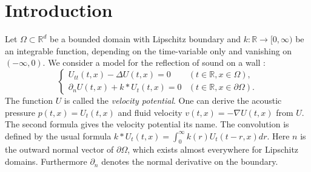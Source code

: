 \documentclass{amsart}
\newcommand{\R}{\mathbb{R}}
\begin{document}
\section{Introduction}\label{sec: Introduction}
Let $\Omega\subset\R^d$ be a bounded domain with Lipschitz boundary and $k:\R\rightarrow[0,\infty)$ be an integrable function, depending on the time-variable only and vanishing on $(-\infty,0)$. We consider a model for the reflection of sound on a wall \cite{PrussProbst1996}: 
\begin{equation}\label{eq: wave equation}
 \begin{cases}
  U_{tt}(t,x) - \Delta U(t,x) = 0 &  (t\in\R, x\in\Omega), \\
  \partial_n U(t,x) + k* U_t(t,x) = 0 & (t\in\R, x\in\partial\Omega).
 \end{cases}
\end{equation}
The function $U$ is called the \textit{velocity potential}. One can derive the acoustic pressure $p(t,x)=U_t(t,x)$ and fluid velocity $v(t,x)=-\nabla U(t,x)$ from $U$. The second formula gives the velocity potential its name. The convolution is defined by the usual formula $k*U_t(t,x)=\int_0^{\infty} k(r)U_t(t-r,x) dr$. Here $n$ is the outward normal vector of $\partial\Omega$, which exists almost everywhere for Lipschitz domains. Furthermore $\partial_n$ denotes the normal derivative on the boundary.
\end{document}
